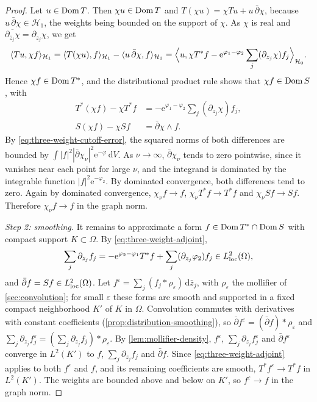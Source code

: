 \begin{proof}
Let $u\in\operatorname{Dom} T$. Then $\chi u\in\operatorname{Dom} T$ and $T(\chi u)=\chi Tu+u\,\bar\partial\chi$, because $u\,\bar\partial\chi\in \mathcal H_1$, the weights being bounded on the support of $\chi$. As $\chi$ is real and $\overline{\partial_{\bar z_j}\chi}=\partial_{z_j}\chi$, we get
\[
 \langle Tu,\chi f\rangle_{\mathcal H_1}=\langle T(\chi u),f\rangle_{\mathcal H_1}-\langle u\,\bar\partial\chi,f\rangle_{\mathcal H_1}
 =\Bigl\langle u,\chi T^*f-\mathrm e^{\varphi_1-\varphi_2}\sum_j(\partial_{z_j}\chi)f_j\Bigr\rangle_{\mathcal H_0}.
\]
Hence $\chi f\in\operatorname{Dom} T^*$, and the distributional product rule shows that $\chi f\in\operatorname{Dom} S$, with
\[
 \begin{split}
 T^*(\chi f)-\chi T^*f
    &=-\mathrm e^{\varphi_1-\varphi_2}\sum_j(\partial_{z_j}\chi)f_j,\\
 S(\chi f)-\chi Sf&=\bar\partial\chi\wedge f.
 \end{split}
\]
By \eqref{eq:three-weight-cutoff-error}, the squared norms of both differences are bounded by $\int|f|^2|\bar\partial\chi_\nu|^2\mathrm e^{-\varphi}\,\mathrm dV$. As $\nu\to\infty$, $\bar\partial\chi_\nu$ tends to zero pointwise, since it vanishes near each point for large $\nu$, and the integrand is dominated by the integrable function $|f|^2\mathrm e^{-\varphi_2}$. By dominated convergence, both differences tend to zero. Again by dominated convergence, $\chi_\nu f\to f$, $\chi_\nu T^*f\to T^*f$ and $\chi_\nu Sf\to Sf$. Therefore $\chi_\nu f\to f$ in the graph norm.

\emph{Step 2: smoothing.} It remains to approximate a form $f\in\operatorname{Dom} T^*\cap\operatorname{Dom} S$ with compact support $K\subset\Omega$. By \eqref{eq:three-weight-adjoint},
\[
 \sum_j\partial_{z_j}f_j=-\mathrm e^{\varphi_2-\varphi_1}T^*f+\sum_j(\partial_{z_j}\varphi_2)f_j\in L^2_{\mathrm{loc}}(\Omega),
\]
and $\bar\partial f=Sf\in L^2_{\mathrm{loc}}(\Omega)$. Let $f^\varepsilon=\sum_j(f_j*\rho_\varepsilon)\,\mathrm d\bar z_j$, with $\rho_\varepsilon$ the mollifier of \cref{sec:convolution}; for small $\varepsilon$ these forms are smooth and supported in a fixed compact neighborhood $K'$ of $K$ in $\Omega$. Convolution commutes with derivatives with constant coefficients (\cref{prop:distribution-smoothing}), so $\bar\partial f^\varepsilon=(\bar\partial f)*\rho_\varepsilon$ and $\sum_j\partial_{z_j}f^\varepsilon_j=(\sum_j\partial_{z_j}f_j)*\rho_\varepsilon$. By \cref{lem:mollifier-density}, $f^\varepsilon$, $\sum_j\partial_{z_j}f^\varepsilon_j$ and $\bar\partial f^\varepsilon$ converge in $L^2(K')$ to $f$, $\sum_j\partial_{z_j}f_j$ and $\bar\partial f$. Since \eqref{eq:three-weight-adjoint} applies to both $f^\varepsilon$ and $f$, and its remaining coefficients are smooth, $T^*f^\varepsilon\to T^*f$ in $L^2(K')$. The weights are bounded above and below on $K'$, so $f^\varepsilon\to f$ in the graph norm.
\end{proof}

